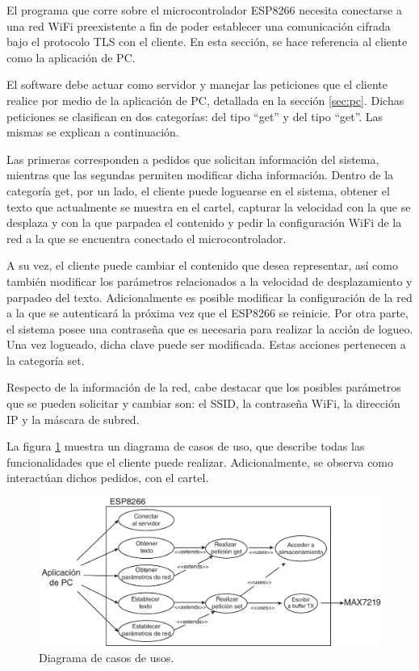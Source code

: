 El programa que corre sobre el microcontrolador ESP8266 necesita conectarse a una red WiFi preexistente a fin de poder establecer una comunicación cifrada bajo el protocolo TLS con el cliente.
En esta sección, se hace referencia al cliente como la aplicación de PC.

El software debe actuar como servidor y manejar las peticiones que el cliente realice por medio de la aplicación de PC, detallada en la sección \ref{sec:pc}.
Dichas peticiones se clasifican en dos categorías: del tipo \enquote{get} y del tipo \enquote{get}. Las mismas se explican a continuación.

Las primeras corresponden a pedidos que solicitan información del sistema, mientras que las segundas permiten modificar dicha información.
Dentro de la categoría get, por un lado, el cliente puede loguearse en el sistema, obtener el texto que actualmente se muestra en el cartel, capturar la velocidad con la que se desplaza y con la que parpadea el contenido y pedir la configuración WiFi de la red a la que se encuentra conectado el microcontrolador.

A su vez, el cliente puede cambiar el contenido que desea representar, así como también modificar los parámetros relacionados a la velocidad de desplazamiento y parpadeo del texto.
Adicionalmente es posible modificar la configuración de la red a la que se autenticará la próxima vez que el ESP8266 se reinicie.
Por otra parte, el sistema posee una contraseña que es necesaria para realizar la acción de logueo.
Una vez logueado, dicha clave puede ser modificada. Estas acciones pertenecen a la categoría set.

Respecto de la información de la red, cabe destacar que los posibles parámetros que se pueden solicitar y cambiar son: el SSID, la contraseña WiFi, la dirección IP y la máscara de subred.

La figura \ref{fig:diagrama_casos_de_uso} muestra un diagrama de casos de uso, que describe todas las funcionalidades que el cliente puede realizar.
Adicionalmente, se observa como interactúan dichos pedidos, con el cartel.

\begin{figure}[!ht]
	\centering
	\includegraphics[width=1\linewidth]{imagenes/sistema-caso-de-uso.pdf}
	\caption{Diagrama de casos de usos.}
	\label{fig:diagrama_casos_de_uso}
\end{figure}

